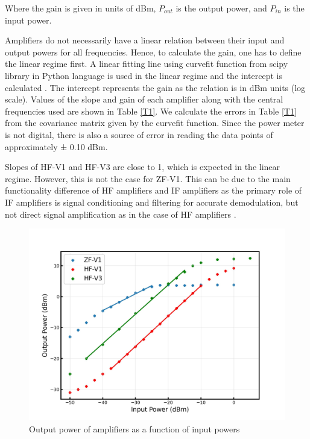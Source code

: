 \documentclass[12pt]{article}
\begin{document}
Where the gain is given in units of dBm, $P_{out}$ is the output power, and $P_{in}$ is the input power. 

Amplifiers do not necessarily have a linear relation between their input and output powers for all frequencies. Hence, to calculate the gain, one has to define the linear regime first. A linear fitting line using curvefit function from scipy library in Python language is used in the linear regime and the intercept is calculated \cite{scipy}. The intercept represents the gain as the relation is in dBm units (log scale). Values of the slope and gain of each amplifier along with the central frequencies used are shown in Table \ref{T1}. We calculate the errors in Table \ref{T1} from the covariance matrix given by the curvefit function. Since the power meter is not digital, there is also a source of error in reading the data points of approximately ± 0.10 dBm. 

Slopes of HF-V1 and HF-V3 are close to 1, which is expected in the linear regime. However, this is not the case for ZF-V1. This can be due to the main functionality difference of HF amplifiers and IF amplifiers as the primary role of IF amplifiers is signal conditioning and filtering for accurate demodulation, but not direct signal amplification as in the case of HF amplifiers \cite{amplifiers}. 

\begin{figure}[H]
\centering
\includegraphics[scale=.5]{fig/Exercise 1.1.jpg}
\caption{Output power of amplifiers as a function of input powers}
\label{figure1}
\end{figure}
\end{document}
